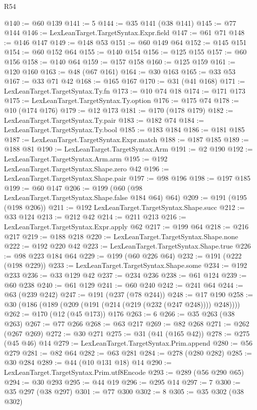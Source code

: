 \begin{lexlean}{R54}
\begin{coremodule}
@140 := @60 @139
@141 := 5
@144 := @35 @141 (@38 @141)
@145 := @77 @144
@146 := LexLeanTarget.TargetSyntax.Expr.field
@147 := @61 @71
@148 := @146 @147
@149 := @148 @53
@151 := @60 @149 @64
@152 := @145 @151
@154 := @60 @152 @64
@155 := @140 @154
@156 := @125 @155
@157 := @60 @156
@158 := @140 @64
@159 := @157 @158
@160 := @125 @159
@161 := @120 @160
@163 := @48 (@67 @161)
@164 := @30 @163
@165 := @33 @53
@167 := @33 @71 @42
@168 := @165 @167
@170 := @31 (@41 @168)
@171 := LexLeanTarget.TargetSyntax.Ty.fn
@173 := @10 @74 @18
@174 := @171 @173
@175 := LexLeanTarget.TargetSyntax.Ty.option
@176 := @175 @74
@178 := @10 (@174 @176)
@179 := @12 @173
@181 := @170 (@178 @179)
@182 := LexLeanTarget.TargetSyntax.Ty.pair
@183 := @182 @74
@184 := LexLeanTarget.TargetSyntax.Ty.bool
@185 := @183 @184
@186 := @181 @185
@187 := LexLeanTarget.TargetSyntax.Expr.match
@188 := @187 @185
@189 := @188 @81
@190 := LexLeanTarget.TargetSyntax.Arm
@191 := @2 @190
@192 := LexLeanTarget.TargetSyntax.Arm.arm
@195 := @192 LexLeanTarget.TargetSyntax.Shape.zero @42
@196 := LexLeanTarget.TargetSyntax.Shape.pair
@197 := @98 @196
@198 := @197 @185
@199 := @60 @147
@206 := @199 (@60 (@98 LexLeanTarget.TargetSyntax.Shape.false @184 @64) @64)
@209 := @191 (@195 (@198 @206))
@211 := @192 LexLeanTarget.TargetSyntax.Shape.succ
@212 := @33 @124
@213 := @212 @42
@214 := @211 @213
@216 := LexLeanTarget.TargetSyntax.Expr.apply @62
@217 := @199 @64
@218 := @216 @217
@219 := @188 @218
@220 := LexLeanTarget.TargetSyntax.Shape.none
@222 := @192 @220 @42
@223 := LexLeanTarget.TargetSyntax.Shape.true
@226 := @98 @223 @184 @64
@229 := @199 (@60 @226 @64)
@232 := @191 (@222 (@198 @229))
@233 := LexLeanTarget.TargetSyntax.Shape.some
@234 := @192 @233
@236 := @33 @129 @42
@237 := @234 @236
@238 := @61 @124
@239 := @60 @238
@240 := @61 @129
@241 := @60 @240
@242 := @241 @64
@244 := @63 (@239 @242)
@247 := @191 (@237 (@78 @244))
@248 := @17 @190
@258 := @30 (@186 (@189 (@209 (@191 (@214 (@219 (@232 (@247 @248)))) @248))))
@262 := @170 (@12 (@45 @173)) @176
@263 := 6
@266 := @35 @263 (@38 @263)
@267 := @77 @266
@268 := @63 @217
@269 := @82 @268
@271 := @262 (@267 @269)
@272 := @30 @271
@275 := @31 (@41 (@165 @42))
@278 := @275 (@45 @46) @14
@279 := LexLeanTarget.TargetSyntax.Prim.append
@280 := @56 @279
@281 := @82 @64
@282 := @63 @281
@284 := @278 (@280 @282)
@285 := @30 @284
@289 := @44 (@10 @131 @18) @14
@290 := LexLeanTarget.TargetSyntax.Prim.utf8Encode
@293 := @289 (@56 @290 @65)
@294 := @30 @293
@295 := @44 @19
@296 := @295 @14
@297 := 7
@300 := @35 @297 (@38 @297)
@301 := @77 @300
@302 := 8
@305 := @35 @302 (@38 @302)

\end{coremodule}
\end{lexlean}
